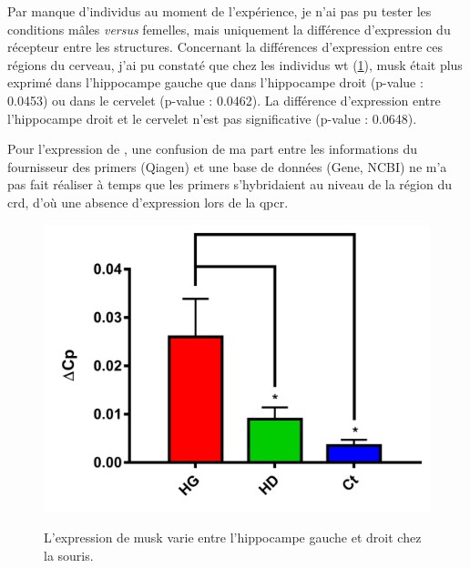 	Par manque d'individus au moment de l'expérience, je n'ai pas pu tester les conditions mâles \emph{versus} femelles, mais uniquement la différence d'expression du récepteur entre les structures. Concernant la différences d'expression entre ces régions du cerveau, j'ai pu constaté que chez les individus \gls{wt} (\cref{fig:qPCRCompaWT}), \gls{musk} était plus exprimé dans l'hippocampe gauche que dans l'hippocampe droit (p-value : 0.0453) ou dans le cervelet (p-value : 0.0462). La différence d'expression entre l'hippocampe droit et le cervelet n'est pas significative (p-value : 0.0648).
	
	Pour l'expression de \mcrd, une confusion de ma part entre les informations du fournisseur des primers (Qiagen\texttrademark) et une base de données (Gene, NCBI) ne m'a pas fait réaliser à temps que les primers s'hybridaient au niveau de la région du \gls{crd}, d'où une absence d'expression lors de la \gls{qpcr}. 
	
	\begin{figure}[h]
		\begin{minipage}{0.5\textwidth}
			\includegraphics[width=\textwidth]{./Images/qPCR/Comp_Struct_WT.jpg}
		\end{minipage}%
		\begin{minipage}{0.5\textwidth}
			\caption{L'expression de \gls{musk} varie entre l'hippocampe gauche et droit chez la souris.}
			\label{fig:qPCRCompaWT}
		\end{minipage}%
	\end{figure}

